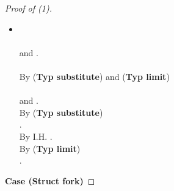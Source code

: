 \documentclass{sigplanconf}
\newcommand{\trule}[1]{(\textbf{Typ #1})}
\begin{document}
\begin{proof}[Proof of (1)]
\begin{itemize}
By \trule{substitute} and \trule{substitute} \\
 \\
 and \\
 and .\\
By \trule{substitute} and S.R.\\
 \\
 and \\
 and .\\
By \trule{substitute} \\
 .\\
By I.H. .\\
By \trule{substitute} \\
 .\\
\item 
\\
\\
 and .\\
  \\
By \trule{substitute} and \trule{limit} \\
  \\
 and .\\
By \trule{substitute} \\
 .\\
By I.H. .\\
By \trule{limit} \\
 .
\end{itemize}
{\bf Case (Struct fork)}


\end{proof}
\end{document}
